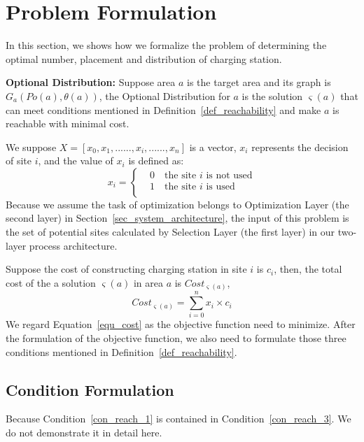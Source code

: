 \section{Problem Formulation}
\label{sec_problem_formulation}
In this section, we shows how we formalize the problem of determining the optimal number, placement and distribution of charging station.
\begin{definition}
\label{def_optimal}
\textbf{Optional Distribution:}
Suppose area $a$ is the target area and its graph is $G_{a}(Po(a),\theta(a))$,
the Optional Distribution for $a$ is the solution $\varsigma(a)$ that can meet conditions mentioned in Definition~\ref{def_reachability} and make $a$ is reachable with minimal cost.
\end{definition}
We suppose $X=[x_0, x_1, ......,x_i,......,x_n]$ is a vector, $x_i$ represents the decision of site $i$,
and the value of $x_i$ is defined as:
\begin{equation}
\label{equ_decision_x_i}
x_i =\left\{
\begin{aligned}
& 0 \quad \text{the site $i$ is not used}\\
& 1 \quad \text{the site $i$ is used}\\
\end{aligned}
\right.
\end{equation}
Because we assume the task of optimization belongs to Optimization Layer (the second layer) in Section~\ref{sec_system_architecture},
the input of this problem is the set of potential sites calculated by Selection Layer (the first layer) in our two-layer process architecture.

Suppose the cost of constructing charging station in site $i$ is $c_i$,
then, the total cost of the a solution $\varsigma(a)$ in area $a$ is $Cost_{\varsigma(a)}$,
\begin{equation}
\label{equ_cost}
Cost_{\varsigma(a)} = \sum_{i=0}^{n}x_i \times c_i
\end{equation}
We regard Equation~\ref{equ_cost} as the objective function need to minimize.
After the formulation of the objective function,
we also need to formulate those three conditions mentioned in Definition~\ref{def_reachability}.
\subsection{Condition Formulation}
Because Condition~\ref{con_reach_1} is contained in Condition~\ref{con_reach_3}.
We do not demonstrate it in detail here.

